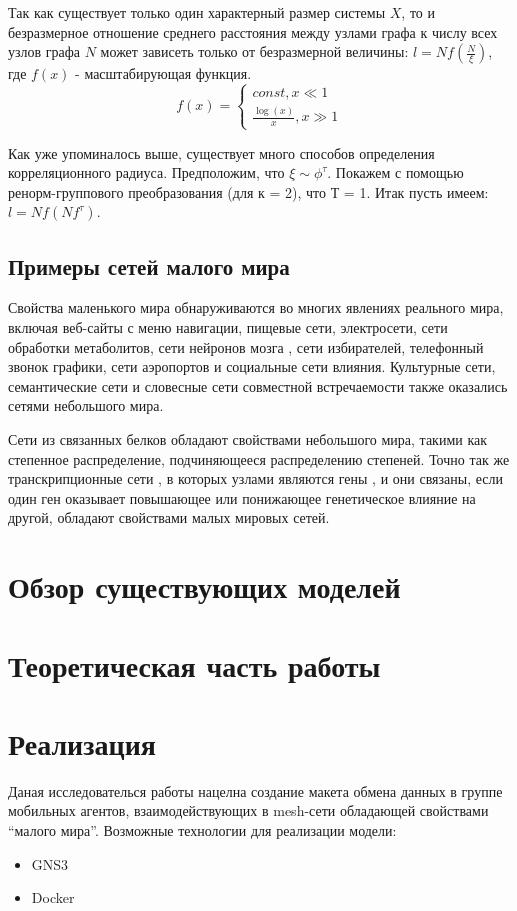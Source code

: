 \documentclass[a4paper]{article}
\begin{document}
Так как существует только один характерный размер системы $X$, то и безразмерное отношение среднего расстояния между узлами графа к числу всех узлов графа $N$ может зависеть только от безразмерной величины: $l = N f( \frac{N}{\xi})$, где $f(x)$ - масштабирующая функция. 
\begin{equation*}
    f(x) = 
    \begin{cases}
       const, x \ll 1 \\
        \frac{\log(x)}{x}, x \gg 1
    \end{cases}
\end{equation*}

Как уже упоминалось выше, существует много способов определения корреляционного радиуса. Предположим, что $\xi \sim \phi^\tau$.
Покажем с помощью ренорм-группового преобразования (для к = 2), что Т = 1. Итак пусть имеем: $l = Nf(Nf^\tau)$.
\subsection{Примеры сетей малого мира}
Свойства маленького мира обнаруживаются во многих явлениях реального мира, включая веб-сайты с меню навигации, пищевые сети, электросети, сети обработки метаболитов, сети нейронов мозга , сети избирателей, телефонный звонок графики, сети аэропортов и социальные сети влияния. Культурные сети, семантические сети и словесные сети совместной встречаемости также оказались сетями небольшого мира.

Сети из связанных белков обладают свойствами небольшого мира, такими как степенное распределение, подчиняющееся распределению степеней. Точно так же транскрипционные сети , в которых узлами являются гены , и они связаны, если один ген оказывает повышающее или понижающее генетическое влияние на другой, обладают свойствами малых мировых сетей.

 \section{Обзор существующих моделей}
\section{Теоретическая часть работы}

\section[]{Реализация}
Даная исследователься работы нацелна создание макета обмена данных в группе мобильных агентов, взаимодействующих в mesh-сети обладающей свойствами “малого мира”.
Возможные технологии для реализации модели:
\begin{itemize}
    \item GNS3
    \item Docker
\end{itemize}
\end{document}
